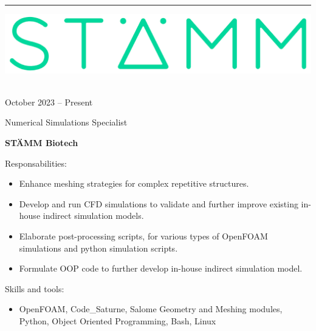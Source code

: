 \documentclass[a4paper,10pt]{article}
\newlength{\cvcolumngapwidth}
\newlength{\cvleftcolumnwidth}
\newlength{\cvrightcolumnwidth}
\newcommand{\cvsectionstyle}[1]{{\normalsize\cvsectionfont\textcolor{cvsectioncolor}{#1}}}
\newcommand{\cvtitlestyle}[1]{{\large\cvtitlefont\textcolor{cvtitlecolor}{#1}}}
\newcommand{\cvdurationstyle}[1]{{\small\cvdurationfont\textcolor{cvdurationcolor}{#1}}}
\newlength{\cvafteritemskipamount}
\newlength{\cvaftersectionskipamount}
\newlength{\cvaftertitleskipamount}
\newlength{\cvparskip}
\newcommand{\cvsection}[1]{
    \begin{minipage}[t]{\cvleftcolumnwidth}
        \raggedleft\cvsectionstyle{#1}
    \end{minipage}%
    \hspace{\cvcolumngapwidth}%
    \begin{minipage}[t]{\cvrightcolumnwidth}
        \textcolor{cvrulecolor}{\rule{\cvrightcolumnwidth}{0.3mm}}
    \end{minipage}

    \vspace{\cvaftersectionskipamount}
}
\newcommand{\cvitem}[2]{
    \begin{minipage}[t]{\cvleftcolumnwidth}
        \raggedleft #1
    \end{minipage}%
    \hspace{\cvcolumngapwidth}%
    \begin{minipage}[t]{\cvrightcolumnwidth}
        \setlength{\parskip}{\cvparskip} #2
    \end{minipage}

    \vspace{\cvafteritemskipamount}
}
\newcommand{\cvtitle}[1]{
    \cvtitlestyle{#1}

    \vspace{\cvaftertitleskipamount}
    \vspace{-\cvparskip}
}
\begin{document}
\cvsection{WORK EXPERIENCE}

\cvitem{
	\begin{minipage}{\textwidth}
    \begin{flushright}
		  \includegraphics[height=0.15\textwidth]{../logos-photos/Logo_STAMM.png}   
    \end{flushright}  
  \end{minipage} \\
  \vspace{0.3cm}
  \cvdurationstyle{October 2023 -- Present}\\
}{
	
  \cvtitle{Numerical Simulations Specialist}
  \textbf{\large STÄMM Biotech}
  
  Responsabilities:
  \begin{itemize}
    \item Enhance meshing strategies for complex repetitive structures. 
    \item Develop and run CFD simulations to validate and further improve existing in-house indirect simulation models.
    \item Elaborate post-processing scripts, for various types of OpenFOAM simulations and python simulation scripts.
    \item Formulate OOP code to further develop in-house indirect simulation model.
  \end{itemize}
  
  Skills and tools:
  \begin{itemize}
    \item OpenFOAM, Code\_Saturne, Salome Geometry and Meshing modules, Python, Object Oriented
      Programming, Bash, Linux 
  \end{itemize}
	
}
\end{document}
